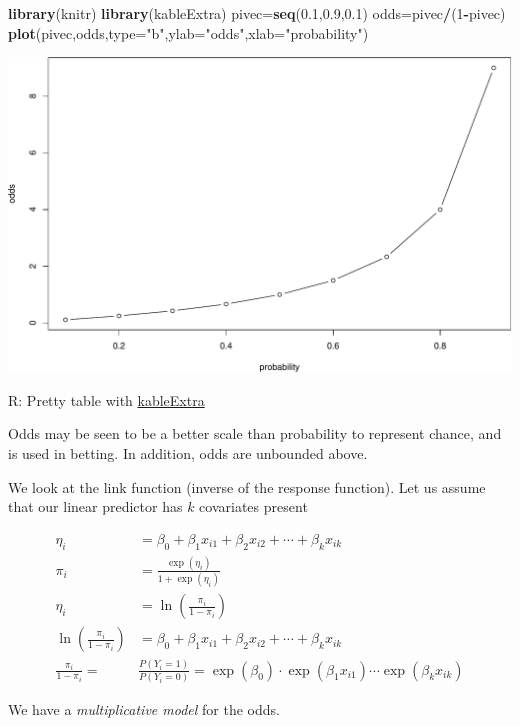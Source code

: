 \documentclass[
  ignorenonframetext,
]{beamer}
\newenvironment{Shaded}{\begin{snugshade}}{\end{snugshade}}
\newcommand{\AttributeTok}[1]{\textcolor[rgb]{0.13,0.29,0.53}{#1}}
\newcommand{\DecValTok}[1]{\textcolor[rgb]{0.00,0.00,0.81}{#1}}
\newcommand{\FloatTok}[1]{\textcolor[rgb]{0.00,0.00,0.81}{#1}}
\newcommand{\FunctionTok}[1]{\textcolor[rgb]{0.13,0.29,0.53}{\textbf{#1}}}
\newcommand{\NormalTok}[1]{#1}
\newcommand{\OtherTok}[1]{\textcolor[rgb]{0.56,0.35,0.01}{#1}}
\newcommand{\SpecialCharTok}[1]{\textcolor[rgb]{0.81,0.36,0.00}{\textbf{#1}}}
\newcommand{\StringTok}[1]{\textcolor[rgb]{0.31,0.60,0.02}{#1}}
\begin{document}
\begin{frame}[fragile]
\begin{Shaded}
\begin{Highlighting}[]
\FunctionTok{library}\NormalTok{(knitr)}
\FunctionTok{library}\NormalTok{(kableExtra)}
\NormalTok{pivec}\OtherTok{=}\FunctionTok{seq}\NormalTok{(}\FloatTok{0.1}\NormalTok{,}\FloatTok{0.9}\NormalTok{,}\FloatTok{0.1}\NormalTok{)}
\NormalTok{odds}\OtherTok{=}\NormalTok{pivec}\SpecialCharTok{/}\NormalTok{(}\DecValTok{1}\SpecialCharTok{{-}}\NormalTok{pivec)}
\FunctionTok{plot}\NormalTok{(pivec,odds,}\AttributeTok{type=}\StringTok{"b"}\NormalTok{,}\AttributeTok{ylab=}\StringTok{"odds"}\NormalTok{,}\AttributeTok{xlab=}\StringTok{"probability"}\NormalTok{)}
\end{Highlighting}
\end{Shaded}

\includegraphics{3BinRegPresentation_files/figure-beamer/unnamed-chunk-8-1.pdf}

R: Pretty table with
\href{https://cran.r-project.org/web/packages/kableExtra/vignettes/awesome_table_in_html.html}{kableExtra}

Odds may be seen to be a better scale than probability to represent
chance, and is used in betting. In addition, odds are unbounded above.
\end{frame}

\begin{frame}
We look at the link function (inverse of the response function). Let us
assume that our linear predictor has \(k\) covariates present

\begin{align*}
\eta_i&= \beta_0+\beta_1 x_{i1}+\beta_2 x_{i2}+\cdots + \beta_k x_{ik}\\
\pi_i&= \frac{\exp(\eta_i)}{1+\exp(\eta_i)}\\
\eta_i&=\ln(\frac{\pi_i}{1-\pi_i})\\
\ln(\frac{\pi_i}{1-\pi_i})&=\beta_0+\beta_1 x_{i1}+\beta_2 x_{i2}+\cdots + \beta_k x_{ik}\\
\frac{\pi_i}{1-\pi_i}=&\frac{P(Y_i=1)}{P(Y_i=0)}=\exp(\beta_0)\cdot \exp(\beta_1 x_{i1})\cdots\exp(\beta_k x_{ik})
\end{align*}

We have a \emph{multiplicative model} for the odds.
\end{frame}
\end{document}
